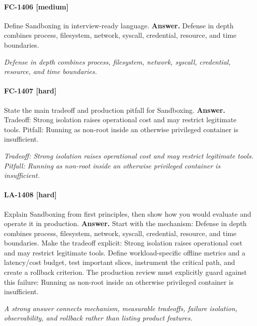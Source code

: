 \paragraph{FC-1406 [medium]} Define Sandboxing in interview-ready language.
\noindent\textbf{Answer.} Defense in depth combines process, filesystem, network, syscall, credential, resource, and time boundaries.
\par\textit{Defense in depth combines process, filesystem, network, syscall, credential, resource, and time boundaries.}
\paragraph{FC-1407 [hard]} State the main tradeoff and production pitfall for Sandboxing.
\noindent\textbf{Answer.} Tradeoff: Strong isolation raises operational cost and may restrict legitimate tools. Pitfall: Running as non-root inside an otherwise privileged container is insufficient.
\par\textit{Tradeoff: Strong isolation raises operational cost and may restrict legitimate tools. Pitfall: Running as non-root inside an otherwise privileged container is insufficient.}
\paragraph{LA-1408 [hard]} Explain Sandboxing from first principles, then show how you would evaluate and operate it in production.
\noindent\textbf{Answer.} Start with the mechanism: Defense in depth combines process, filesystem, network, syscall, credential, resource, and time boundaries. Make the tradeoff explicit: Strong isolation raises operational cost and may restrict legitimate tools. Define workload-specific offline metrics and a latency/cost budget, test important slices, instrument the critical path, and create a rollback criterion. The production review must explicitly guard against this failure: Running as non-root inside an otherwise privileged container is insufficient.
\par\textit{A strong answer connects mechanism, measurable tradeoffs, failure isolation, observability, and rollback rather than listing product features.}
